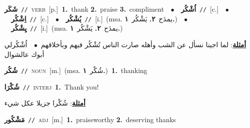 \documentclass[10pt,a4paper,twoside]{article} %
\begin{document}
\begin{multicols}{2}
{\setlength\topsep{0pt}\textbf{\foreignlanguage{arabic}{شَكَر}}\ {\color{gray}\texttt{//}\color{black}}\ \textsc{verb}\ [p.]\ \textbf{1.}~thank  \textbf{2.}~praise  \textbf{3.}~compliment\ \ $\bullet$\ \ \setlength\topsep{0pt}\textbf{\foreignlanguage{arabic}{اُشْكُر}}\ {\color{gray}\texttt{//}\color{black}}\ [c.]\ \ $\bullet$\ \ \setlength\topsep{0pt}\textbf{\foreignlanguage{arabic}{اِشْكُر}}\ {\color{gray}\texttt{//}\color{black}}\ [c.]\ \ $\bullet$\ \ \setlength\topsep{0pt}\textbf{\foreignlanguage{arabic}{يُشْكُر}}\ {\color{gray}\texttt{//}\color{black}}\ [i.]\ \color{gray}(msa. \foreignlanguage{arabic}{يمدَح}~\foreignlanguage{arabic}{\textbf{٢.}}  \foreignlanguage{arabic}{يَشْكُر}~\foreignlanguage{arabic}{\textbf{١.}})\color{black}\ \ $\bullet$\ \ \setlength\topsep{0pt}\textbf{\foreignlanguage{arabic}{يِشْكُر}}\ {\color{gray}\texttt{//}\color{black}}\ [i.]\ \color{gray}(msa. \foreignlanguage{arabic}{يمدَح}~\foreignlanguage{arabic}{\textbf{٢.}}  \foreignlanguage{arabic}{يَشْكُر}~\foreignlanguage{arabic}{\textbf{١.}})\color{black}\  \begin{flushright}\color{gray}\foreignlanguage{arabic}{\textbf{\underline{\foreignlanguage{arabic}{أمثلة}}}: لما اجينا نسأل عن الشب وأهله صارت الناس تُشْكُر فيهم وبأخلاقهم\ $\bullet$\ \  اُشْكُرلي أبوك عالشوال}\end{flushright}\color{black}} \vspace{2mm}

{\setlength\topsep{0pt}\textbf{\foreignlanguage{arabic}{شُكُر}}\ {\color{gray}\texttt{//}\color{black}}\ \textsc{noun}\ [m.]\ \color{gray}(msa. \foreignlanguage{arabic}{شُكْر}~\foreignlanguage{arabic}{\textbf{١.}})\color{black}\ \textbf{1.}~thanking\ } \vspace{2mm}

{\setlength\topsep{0pt}\textbf{\foreignlanguage{arabic}{شُكْرَا}}\ {\color{gray}\texttt{//}\color{black}}\ \textsc{interj}\ \textbf{1.}~Thank you!\  \begin{flushright}\color{gray}\foreignlanguage{arabic}{\textbf{\underline{\foreignlanguage{arabic}{أمثلة}}}: شُكْرا جزيلا عكل شيء}\end{flushright}\color{black}} \vspace{2mm}

{\setlength\topsep{0pt}\textbf{\foreignlanguage{arabic}{مَشْكُور}}\ {\color{gray}\texttt{//}\color{black}}\ \textsc{adj}\ [m.]\ \textbf{1.}~praiseworthy  \textbf{2.}~deserving thanks\ } \vspace{2mm}


\end{multicols}
\end{document}
